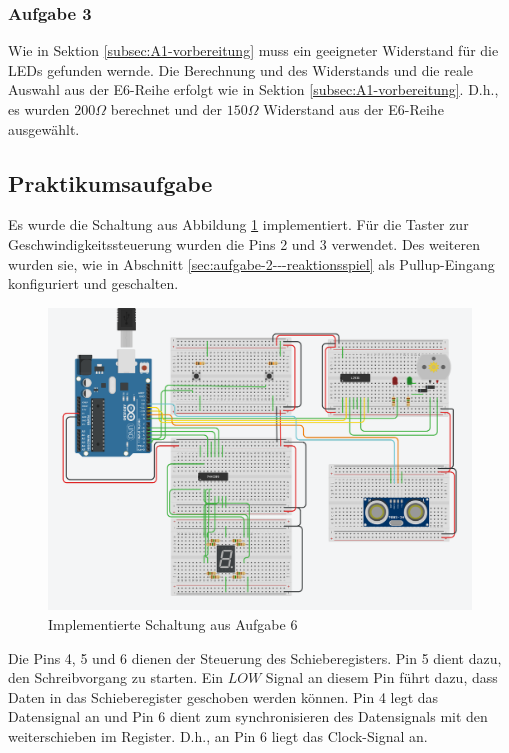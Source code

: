 \subsubsection{Aufgabe 3}

Wie in Sektion \ref{subsec:A1-vorbereitung} muss ein geeigneter Widerstand für die LEDs gefunden wernde.
Die Berechnung und des Widerstands und die reale Auswahl aus der E6-Reihe erfolgt wie in Sektion \ref{subsec:A1-vorbereitung}.
D.h., es wurden $200\Omega$ berechnet und der $150\Omega$ Widerstand aus der E6-Reihe ausgewählt.

\subsection{Praktikumsaufgabe}
\label{subsec:a6-praktikumsaufgabe}

Es wurde die Schaltung aus Abbildung \ref{fig:a6-implementierung} implementiert.
Für die Taster zur Geschwindigkeitssteuerung wurden die Pins 2 und 3 verwendet.
Des weiteren wurden sie, wie in Abschnitt \ref{sec:aufgabe-2---reaktionsspiel} als Pullup-Eingang konfiguriert und geschalten.

\begin{figure}[h]
    \centering
    \includegraphics[width=\textwidth]{pictures/a6-praktikum.png}
    \caption{Implementierte Schaltung aus Aufgabe 6}
    \label{fig:a6-implementierung}
\end{figure}

Die Pins 4, 5 und 6 dienen der Steuerung des Schieberegisters.
Pin 5 dient dazu, den Schreibvorgang zu starten.
Ein $LOW$ Signal an diesem Pin führt dazu, dass Daten in das Schieberegister geschoben werden können.
Pin 4 legt das Datensignal an und Pin 6 dient zum synchronisieren des Datensignals mit den weiterschieben im Register.
D.h., an Pin 6 liegt das Clock-Signal an.

